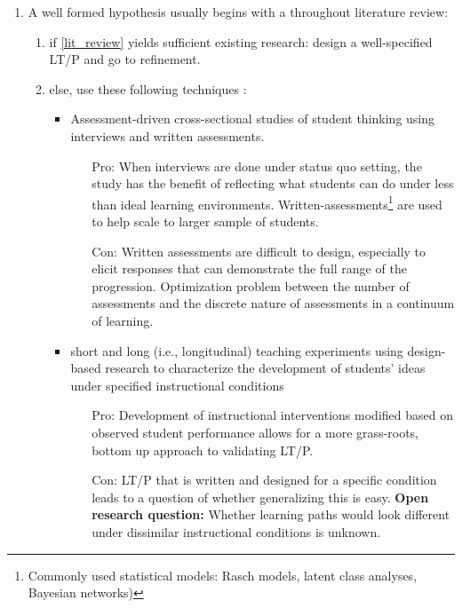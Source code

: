\documentclass{TC}
\begin{document}
\begin{enumerate}[(1)]
\item\label{lit_review} A well formed hypothesis usually begins with a throughout literature review: 
	\begin{enumerate} 
	\item if \ref{lit_review} yields sufficient existing research: design a well-specified LT/P and go to refinement.
	\item else, use these following techniques \parencite{duncan_learning_2018}:
		\begin{itemize}
		\item Assessment-driven cross-sectional studies of student thinking using interviews and written assessments.
			\begin{itemize}
			\item[Pro:] When interviews are done under status quo setting, the study has the benefit of reflecting what students can do under less than ideal learning environments. Written-assessments\footnote{Commonly used statistical models: Rasch models, latent class analyses, Bayesian networks)} are used to help scale to larger sample of students.
			\item[Con:] Written assessments are difficult to design, especially to elicit responses that can demonstrate the full range of the progression. Optimization problem between the number of assessments and the discrete nature of assessments in a continuum of learning.
			\end{itemize}
		\item short and long (i.e., longitudinal) teaching experiments using design-based research to characterize the development of students' ideas under specified instructional conditions
			\begin{itemize}
			\item[Pro:] Development of instructional interventions modified based on observed student performance allows for a more grass-roots, bottom up approach to validating LT/P. 
			\item[Con:] LT/P that is written and designed for a specific condition leads to a question of whether generalizing this is easy. \textbf{Open research question:} Whether learning paths would look different under dissimilar instructional conditions is unknown.
			\end{itemize}
		\end{itemize}
	\end{enumerate}
\end{enumerate}
\end{document}
